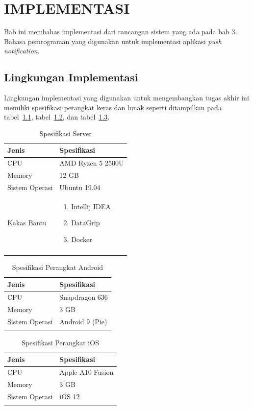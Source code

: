 \chapter {IMPLEMENTASI}
\par Bab ini membahas implementasi dari rancangan sistem yang ada pada bab 3. Bahasa pemrograman yang digunakan untuk implementasi aplikasi \textit{push notification}.

\section{Lingkungan Implementasi}
\par Lingkungan implementasi yang digunakan untuk mengembangkan tugas akhir ini memiliki spesifikasi perangkat keras dan lunak seperti ditampilkan pada tabel~\ref{tabel_spesifikasi_server}, tabel~\ref{tabel_spesifikasi_perangkat_android}, dan tabel~\ref{tabel_spesifikasi_perangkat_ios}.
\begin{longtable}{|p{2.5cm}|p{6.5cm}|}
    \hline
    \textbf{Jenis} & \textbf{Spesifikasi} \\ \hline
    CPU & AMD Ryzen 5 2500U \\ \hline
    Memory & 12 GB \\ \hline
    Sistem Operasi & Ubuntu 19.04 \\ \hline
    Kakas Bantu &
    \begin{enumerate}
        \item Intellij IDEA
        \item DataGrip
        \item Docker
    \end{enumerate} \\ \hline
    \caption{Spesifikasi Server}
    \label{tabel_spesifikasi_server}
\end{longtable}
\begin{longtable}{|p{2.5cm}|p{6.5cm}|}
    \hline
    \textbf{Jenis} & \textbf{Spesifikasi} \\ \hline
    CPU & Snapdragon 636 \\ \hline
    Memory & 3 GB \\ \hline
    Sistem Operasi & Android 9 (Pie) \\ \hline
    \caption{Spesifikasi Perangkat Android}
    \label{tabel_spesifikasi_perangkat_android}
\end{longtable}
\begin{longtable}{|p{2.5cm}|p{6.5cm}|}
    \hline
    \textbf{Jenis} & \textbf{Spesifikasi} \\ \hline
    CPU & Apple A10 Fusion \\ \hline
    Memory & 3 GB \\ \hline
    Sistem Operasi & iOS 12 \\ \hline
    \caption{Spesifikasi Perangkat iOS}
    \label{tabel_spesifikasi_perangkat_ios}
\end{longtable}

